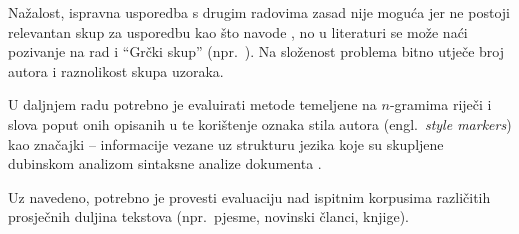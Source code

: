 \documentclass[11pt,english]{article}
\newcommand{\engl}[1]{(engl.~\emph{#1})}
\renewcommand{\labelitemi}{\textendash}
\renewenvironment{itemize}{%
\begin{list}{\labelitemi}{%
\setlength{\topsep}{0mm}
\setlength{\itemsep}{-1mm}
\setlength{\labelindent}{\parindent}
\setlength{\leftmargin}{6mm}}}
{\end{list}}
\begin{document}
\begin{multicols}{2}
Nažalost, ispravna usporedba s drugim radovima zasad nije moguća jer ne postoji
relevantan skup za usporedbu kao što navode \citep{zhao2005effective}, no u
literaturi se može naći pozivanje na rad
\citep{stamatatos2001computer,stamatatos1999automatic} i ``Grčki skup''
(npr.~\citep{keselj2003n}). Na složenost problema bitno utječe broj autora i
raznolikost skupa uzoraka.

U daljnjem radu potrebno je evaluirati metode temeljene na $n$-gramima riječi i
slova poput onih opisanih u
\citep{keselj2003n,peng2003language,coyotl2006authorship} te korištenje oznaka
stila autora \engl{style markers} kao značajki – informacije vezane uz strukturu
jezika koje su skupljene dubinskom analizom sintaksne analize dokumenta
\citep{stamatatos2001computer,diri2003automatic,luyckx2005shallow}.

Uz navedeno, potrebno je provesti evaluaciju nad ispitnim korpusima različitih
prosječnih duljina tekstova (npr.~pjesme, novinski članci, knjige).





\end{multicols}
\end{document}
